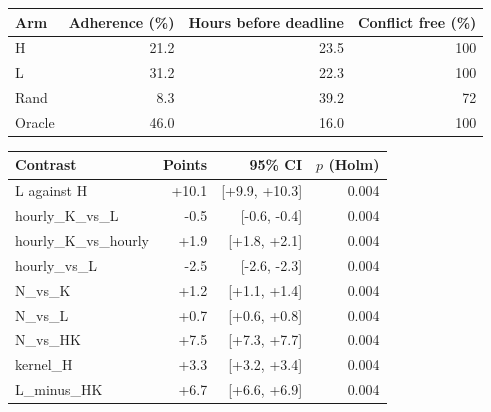 \begin{tabular}{lrrr}
\hline
Arm & Adherence (\%) & Hours before deadline & Conflict free (\%) \\
\hline
H & 21.2 & 23.5 & 100 \\
L & 31.2 & 22.3 & 100 \\
Rand & 8.3 & 39.2 & 72 \\
Oracle & 46.0 & 16.0 & 100 \\
\hline
\end{tabular}

\begin{tabular}{lrrr}
\hline
Contrast & Points & 95\% CI & $p$ (Holm) \\
\hline
L against H & +10.1 & [+9.9, +10.3] & 0.004 \\
hourly_K_vs_L & -0.5 & [-0.6, -0.4] & 0.004 \\
hourly_K_vs_hourly & +1.9 & [+1.8, +2.1] & 0.004 \\
hourly_vs_L & -2.5 & [-2.6, -2.3] & 0.004 \\
N_vs_K & +1.2 & [+1.1, +1.4] & 0.004 \\
N_vs_L & +0.7 & [+0.6, +0.8] & 0.004 \\
N_vs_HK & +7.5 & [+7.3, +7.7] & 0.004 \\
kernel_H & +3.3 & [+3.2, +3.4] & 0.004 \\
L_minus_HK & +6.7 & [+6.6, +6.9] & 0.004 \\
\hline
\end{tabular}
